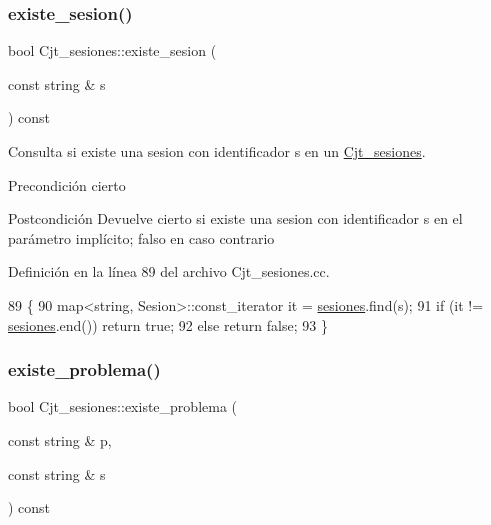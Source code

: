 \subsubsection{\texorpdfstring{existe\+\_\+sesion()}{existe\_sesion()}}
{\footnotesize\ttfamily bool Cjt\+\_\+sesiones\+::existe\+\_\+sesion (\begin{DoxyParamCaption}\item[{const string \&}]{s }\end{DoxyParamCaption}) const}



Consulta si existe una sesion con identificador s en un \mbox{\hyperlink{class_cjt__sesiones}{Cjt\+\_\+sesiones}}. 

\begin{DoxyPrecond}{Precondición}
cierto 
\end{DoxyPrecond}
\begin{DoxyPostcond}{Postcondición}
Devuelve cierto si existe una sesion con identificador s en el parámetro implícito; falso en caso contrario 
\end{DoxyPostcond}


Definición en la línea 89 del archivo Cjt\+\_\+sesiones.\+cc.


\begin{DoxyCode}
89                                                           \{
90       map<string, Sesion>::const\_iterator it = \mbox{\hyperlink{class_cjt__sesiones_a87e835a62e561eeb0f93eedbdcbe1802}{sesiones}}.find(s);
91       \textcolor{keywordflow}{if} (it != \mbox{\hyperlink{class_cjt__sesiones_a87e835a62e561eeb0f93eedbdcbe1802}{sesiones}}.end()) \textcolor{keywordflow}{return} \textcolor{keyword}{true};
92       \textcolor{keywordflow}{else} \textcolor{keywordflow}{return} \textcolor{keyword}{false};
93     \}
\end{DoxyCode}
\mbox{\label{class_cjt__sesiones_a4d62c47239f444a5612e37738bdab300}} 
\subsubsection{\texorpdfstring{existe\+\_\+problema()}{existe\_problema()}}
{\footnotesize\ttfamily bool Cjt\+\_\+sesiones\+::existe\+\_\+problema (\begin{DoxyParamCaption}\item[{const string \&}]{p,  }\item[{const string \&}]{s }\end{DoxyParamCaption}) const}



